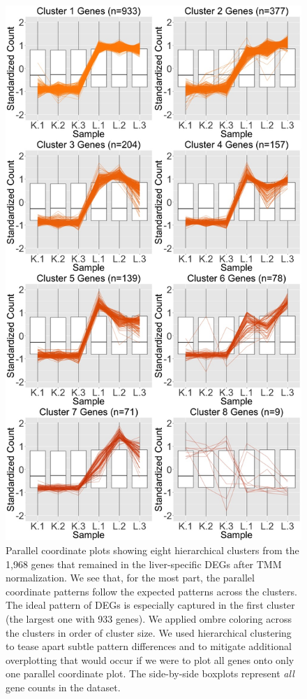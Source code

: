 \documentclass{article}
\begin{document}
  \null
  \begin{figure}[t!]
  \centerline{\includegraphics[width=0.65\columnwidth]{../MakeFigures/lkClustersOrig.jpg}}
  \caption{Parallel coordinate plots showing eight hierarchical clusters from the 1,968 genes that remained in the liver-specific DEGs after TMM normalization. We see that, for the most part, the parallel coordinate patterns follow the expected patterns across the clusters. The ideal pattern of DEGs is especially captured in the first cluster (the largest one with 933 genes). We applied ombre coloring across the clusters in order of cluster size. We used hierarchical clustering to tease apart subtle pattern differences and to mitigate additional overplotting that would occur if we were to plot all genes onto only one parallel coordinate plot. The side-by-side boxplots represent \textit{all} gene counts in the dataset.
  \label{lkClustersOrig}}
  \end{figure}
  
\end{document}
